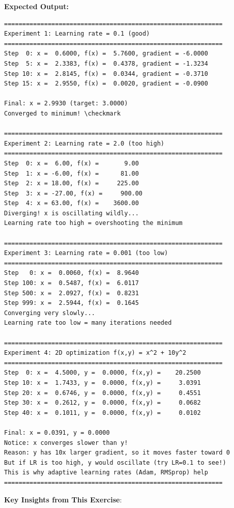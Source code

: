 \documentclass[11pt,oneside]{book}
\begin{document}
\textbf{Expected Output:}
\begin{lstlisting}
============================================================
Experiment 1: Learning rate = 0.1 (good)
============================================================
Step  0: x =  0.6000, f(x) =  5.7600, gradient = -6.0000
Step  5: x =  2.3383, f(x) =  0.4378, gradient = -1.3234
Step 10: x =  2.8145, f(x) =  0.0344, gradient = -0.3710
Step 15: x =  2.9550, f(x) =  0.0020, gradient = -0.0900

Final: x = 2.9930 (target: 3.0000)
Converged to minimum! \checkmark

============================================================
Experiment 2: Learning rate = 2.0 (too high)
============================================================
Step  0: x =  6.00, f(x) =       9.00
Step  1: x = -6.00, f(x) =      81.00
Step  2: x = 18.00, f(x) =     225.00
Step  3: x = -27.00, f(x) =     900.00
Step  4: x = 63.00, f(x) =    3600.00
Diverging! x is oscillating wildly...
Learning rate too high = overshooting the minimum

============================================================
Experiment 3: Learning rate = 0.001 (too low)
============================================================
Step   0: x =  0.0060, f(x) =  8.9640
Step 100: x =  0.5487, f(x) =  6.0117
Step 500: x =  2.0927, f(x) =  0.8231
Step 999: x =  2.5944, f(x) =  0.1645
Converging very slowly...
Learning rate too low = many iterations needed

============================================================
Experiment 4: 2D optimization f(x,y) = x^2 + 10y^2
============================================================
Step  0: x =  4.5000, y =  0.0000, f(x,y) =    20.2500
Step 10: x =  1.7433, y =  0.0000, f(x,y) =     3.0391
Step 20: x =  0.6746, y =  0.0000, f(x,y) =     0.4551
Step 30: x =  0.2612, y =  0.0000, f(x,y) =     0.0682
Step 40: x =  0.1011, y =  0.0000, f(x,y) =     0.0102

Final: x = 0.0391, y = 0.0000
Notice: x converges slower than y!
Reason: y has 10x larger gradient, so it moves faster toward 0
But if LR is too high, y would oscillate (try LR=0.1 to see!)
This is why adaptive learning rates (Adam, RMSprop) help
============================================================
\end{lstlisting}

\textbf{Key Insights from This Exercise}:
\end{document}
